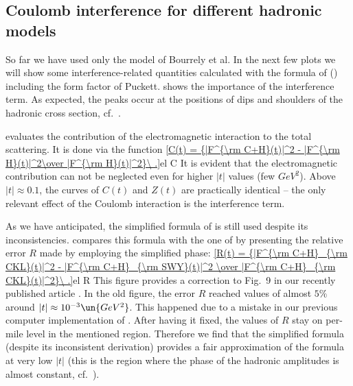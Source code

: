 \subsection[int mod]{Coulomb interference for different hadronic models}

So far we have used only the model of Bourrely et al. In the next few plots we will show some interference-related quantities calculated with the formula of \KaL{} () including the form factor of Puckett.  shows the importance of the interference term. As expected, the peaks occur at the positions of dips and shoulders of the hadronic cross section, cf.~.

 evaluates the contribution of the electromagnetic interaction to the total scattering. It is done via the function
\eqref{C(t) = {|F^{\rm C+H}(t)|^2 - |F^{\rm H}(t)|^2\over |F^{\rm H}(t)|^2}\ .}{el C}
It is evident that the electromagnetic contribution can not be neglected even for higher $|t|$ values (few $GeV^2$). Above $|t|\approx 0.1$, the curves of $C(t)$ and $Z(t)$ are practically identical -- the only relevant effect of the Coulomb interaction is the interference term.



As we have anticipated, the simplified formula of \WaY{} is still used despite its inconsistencies.  compares this formula with the one of \KaL{} by presenting the relative error $R$ made by employing the simplified \WY{} phase:
\eqref{R(t) = {|F^{\rm C+H}_{\rm CKL}(t)|^2 - |F^{\rm C+H}_{\rm SWY}(t)|^2 \over |F^{\rm C+H}_{\rm CKL}(t)|^2}\ .}{el R}
This figure provides a correction to Fig.~9 in our recently published article . In the old figure, the error $R$ reached values of almost $5\%$ around $|t|\approx 10^{-3}\un{GeV^2}$. This happened due to a mistake in our previous computer implementation of . After having it fixed, the values of $R$ stay on per-mile level in the mentioned region. Therefore we find that the simplified \WY{} formula (despite its inconsistent derivation) provides a fair approximation of the \KL{} formula at very low $|t|$ (this is the region where the phase of the hadronic amplitudes is almost constant, cf.~).

